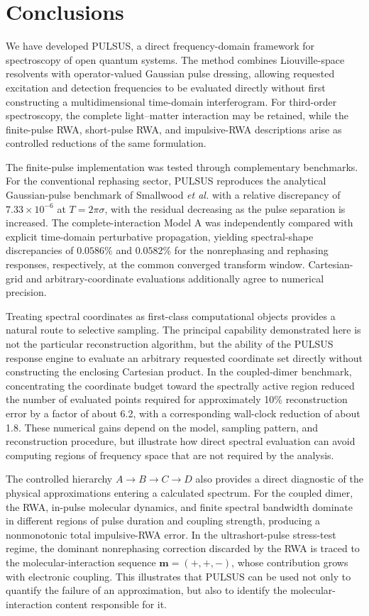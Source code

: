 \section{Conclusions}
\label{sec:conclusions}

We have developed PULSUS, a direct frequency-domain framework for
spectroscopy of open quantum systems. The method combines
Liouville-space resolvents with operator-valued Gaussian pulse dressing,
allowing requested excitation and detection frequencies to be evaluated
directly without first constructing a multidimensional time-domain
interferogram. For third-order spectroscopy, the complete
light--matter interaction may be retained, while the finite-pulse RWA,
short-pulse RWA, and impulsive-RWA descriptions arise as controlled
reductions of the same formulation.

The finite-pulse implementation was tested through complementary
benchmarks. For the conventional rephasing sector, PULSUS reproduces
the analytical Gaussian-pulse benchmark of Smallwood \textit{et al.}
with a relative discrepancy of $7.33\times10^{-6}$ at
$T=2\pi\sigma$, with the residual decreasing as the pulse separation
is increased. The complete-interaction Model A was independently
compared with explicit time-domain perturbative propagation, yielding
spectral-shape discrepancies of $0.0586\%$ and $0.0582\%$ for the
nonrephasing and rephasing responses, respectively, at the common
converged transform window. Cartesian-grid and arbitrary-coordinate
evaluations additionally agree to numerical precision.

Treating spectral coordinates as first-class computational objects
provides a natural route to selective sampling. The principal capability
demonstrated here is not the particular reconstruction algorithm, but
the ability of the PULSUS response engine to evaluate an arbitrary
requested coordinate set directly without constructing the enclosing
Cartesian product. In the coupled-dimer benchmark, concentrating the
coordinate budget toward the spectrally active region reduced the number
of evaluated points required for approximately 10\% reconstruction error
by a factor of about 6.2, with a corresponding wall-clock reduction of
about 1.8. These numerical gains depend on the model, sampling pattern,
and reconstruction procedure, but illustrate how direct spectral
evaluation can avoid computing regions of frequency space that are not
required by the analysis.

The controlled hierarchy
$A\rightarrow B\rightarrow C\rightarrow D$ also provides a direct
diagnostic of the physical approximations entering a calculated
spectrum. For the coupled dimer, the RWA, in-pulse molecular dynamics,
and finite spectral bandwidth dominate in different regions of pulse
duration and coupling strength, producing a nonmonotonic total
impulsive-RWA error. In the ultrashort-pulse stress-test regime, the
dominant nonrephasing correction discarded by the RWA is traced to the
molecular-interaction sequence
$\mathbf{m}=(+,+,-)$, whose contribution grows with electronic
coupling. This illustrates that PULSUS can be used not only to quantify
the failure of an approximation, but also to identify the
molecular-interaction content responsible for it.

